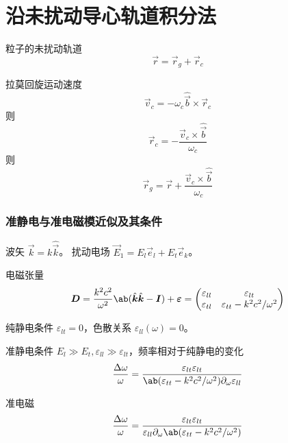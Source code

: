 \section{沿未扰动导心轨道积分法}

粒子的未扰动轨道
\begin{equation}
\vec{r} = \vec{r}_g + \vec{r}_c
\end{equation}

拉莫回旋运动速度
\begin{equation}
\vec{v}_c = - \omega_c \hat{\vec{b}} \times \vec{r}_c
\end{equation}
则
\begin{equation}
\vec{r}_c = - \frac{\vec{v}_c \times \hat{\vec{b}}}{\omega_c}
\end{equation}
则
\begin{equation}
\vec{r}_g = \vec{r} + \frac{\vec{v}_c \times \hat{\vec{b}}}{\omega_c}
\end{equation}


\subsubsection{准静电与准电磁模近似及其条件}

波矢 $\vec{k} = k \hat{\vec{k}}$。
扰动电场 $\vec{E}_1 = E_l \vec{e}_l + E_t \vec{e}_k$。

电磁张量
\begin{equation}
\vec{D} = \frac{k^2 c^2}{\omega^2} \ab(\hat{\vec{k}}\hat{\vec{k}}
- \vec{I}) + \vec{\varepsilon}
= \begin{pmatrix}
    \varepsilon_{ll} & \varepsilon_{lt} \\
    \varepsilon_{tl} & \varepsilon_{tt} - k^2 c^2 / \omega^2
\end{pmatrix}
\end{equation}

纯静电条件 $\varepsilon_{lt} = 0$，色散关系 $\varepsilon_{ll}(\omega) = 0$。

准静电条件 $E_l \gg E_t, \varepsilon_{ll} \gg \varepsilon_{lt}$，频率相对于纯静电的变化
\begin{equation}
\frac{\Delta\omega}{\omega}
=\frac{\varepsilon_{lt} \varepsilon_{lt}}
{\ab(\varepsilon_{tt} - k^2 c^2 / \omega^2) \pdv{\varepsilon_{ll}}!{\omega}}
\end{equation}

准电磁
\begin{equation}
\frac{\Delta\omega}{\omega}
=\frac{\varepsilon_{lt} \varepsilon_{lt}}
{\varepsilon_{ll} \pdv{\ab(\varepsilon_{tt} - k^2 c^2 / \omega^2)}!{\omega}}
\end{equation}

